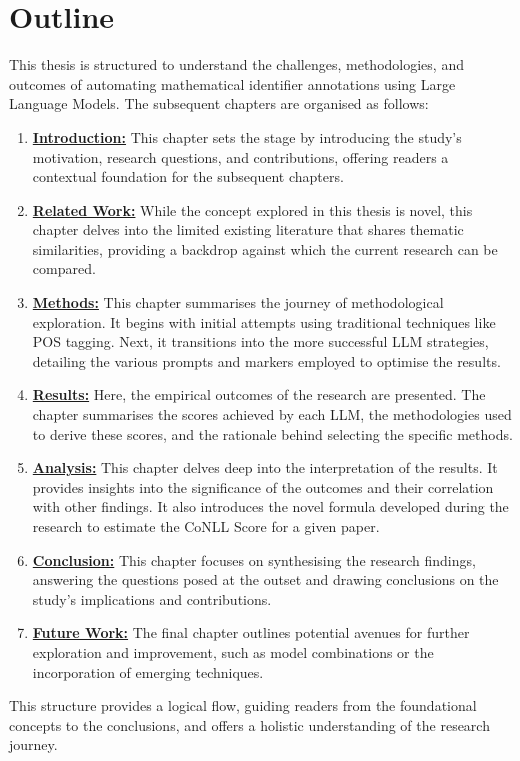 \section{Outline}

This thesis is structured to understand the challenges, methodologies, and outcomes of automating mathematical identifier annotations using Large Language Models. The subsequent chapters are organised as follows:

\begin{enumerate}
    \item \textbf{\hyperref[chapter:introduction]{Introduction:}}  This chapter sets the stage by introducing the study's motivation, research questions, and contributions, offering readers a contextual foundation for the subsequent chapters.
    
    \item \textbf{\hyperref[chapter:related_work]{Related Work:}} While the concept explored in this thesis is novel, this chapter delves into the limited existing literature that shares thematic similarities, providing a backdrop against which the current research can be compared.
    
    \item \textbf{\hyperref[chapter:methods]{Methods:}} This chapter summarises the journey of methodological exploration. It begins with initial attempts using traditional techniques like \ac{POS} tagging. Next, it transitions into the more successful LLM strategies, detailing the various prompts and markers employed to optimise the results.
    
    \item \textbf{\hyperref[chapter:results]{Results:}} Here, the empirical outcomes of the research are presented. The chapter summarises the scores achieved by each LLM, the methodologies used to derive these scores, and the rationale behind selecting the specific methods.
    
    \item \textbf{\hyperref[chapter:analysis]{Analysis:}} This chapter delves deep into the interpretation of the results. It provides insights into the significance of the outcomes and their correlation with other findings. It also introduces the novel formula developed during the research to estimate the CoNLL Score for a given paper. %
    
    \item \textbf{\hyperref[chapter:conclusion]{Conclusion:}} This chapter focuses on synthesising the research findings, answering the questions posed at the outset and drawing conclusions on the study's implications and contributions.
    
    \item \textbf{\hyperref[chapter:future_works]{Future Work:}} The final chapter outlines potential avenues for further exploration and improvement, such as model combinations or the incorporation of emerging techniques.
    
    
\end{enumerate}

This structure provides a logical flow, guiding readers from the foundational concepts to the conclusions, and offers a holistic understanding of the research journey.
